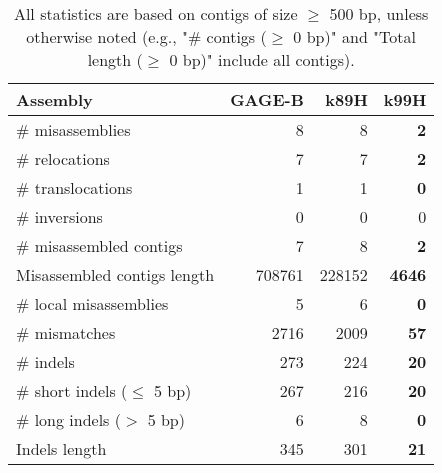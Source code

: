 \documentclass[12pt,a4paper]{article}
\begin{document}
\begin{table}[ht]
\begin{center}
\caption{All statistics are based on contigs of size $\geq$ 500 bp, unless otherwise noted (e.g., "\# contigs ($\geq$ 0 bp)" and "Total length ($\geq$ 0 bp)" include all contigs).}
\begin{tabular}{|l*{3}{|r}|}
\hline
Assembly & GAGE-B & k89H & k99H \\ \hline
\# misassemblies & 8 & 8 & {\bf 2} \\ \hline
\hspace{5mm}\# relocations & 7 & 7 & {\bf 2} \\ \hline
\hspace{5mm}\# translocations & 1 & 1 & {\bf 0} \\ \hline
\hspace{5mm}\# inversions & 0 & 0 & 0 \\ \hline
\# misassembled contigs & 7 & 8 & {\bf 2} \\ \hline
Misassembled contigs length & 708761 & 228152 & {\bf 4646} \\ \hline
\# local misassemblies & 5 & 6 & {\bf 0} \\ \hline
\# mismatches & 2716 & 2009 & {\bf 57} \\ \hline
\# indels & 273 & 224 & {\bf 20} \\ \hline
\hspace{5mm}\# short indels ($\leq$ 5 bp) & 267 & 216 & {\bf 20} \\ \hline
\hspace{5mm}\# long indels ($>$ 5 bp) & 6 & 8 & {\bf 0} \\ \hline
Indels length & 345 & 301 & {\bf 21} \\ \hline
\end{tabular}
\end{center}
\end{table}
\end{document}
